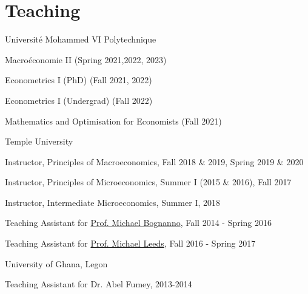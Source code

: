 \documentclass[12pt,letterpaper]{article}
\renewenvironment{itemize}{
  \begin{list}{}{
    \setlength{\leftmargin}{1.5em}
  }
}{
  \end{list}
}
\begin{document}
\section*{Teaching}
\begin{enumerate}
	\item Universit\'e Mohammed VI Polytechnique
	\begin{itemize}
		\item Macro\'economie II (Spring 2021,2022, 2023)
		\item Econometrics I (PhD) (Fall 2021, 2022)
		\item Econometrics I (Undergrad) (Fall 2022)
		\item Mathematics and Optimisation for Economists (Fall 2021)
	\end{itemize}
	\item Temple University
	\begin{itemize}
		\item Instructor, Principles of Macroeconomics, Fall 2018 \& 2019, Spring 2019 \& 2020
		\item Instructor, Principles of Microeconomics, Summer I (2015 \& 2016), Fall 2017
		\item Instructor, Intermediate Microeconomics, Summer I, 2018
		\item Teaching Assistant for \href{https://liberalarts.temple.edu/academics/faculty/bognanno-michael}{Prof. Michael Bognanno}, Fall 2014 - Spring 2016
		\item Teaching Assistant for \href{https://liberalarts.temple.edu/academics/faculty/leeds-michael}{Prof. Michael Leeds}, Fall 2016 - Spring 2017
	\end{itemize}
	\item University of Ghana, Legon
	\begin{itemize}
		\item Teaching Assistant for Dr. Abel Fumey, 2013-2014
	\end{itemize}
\end{enumerate}
\end{document}
